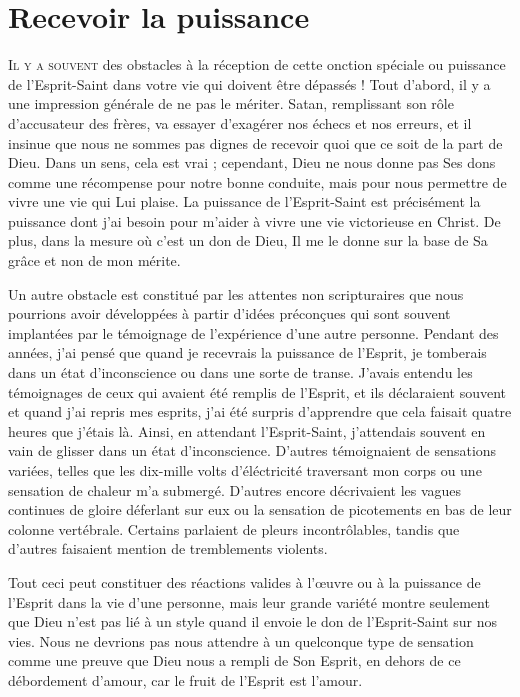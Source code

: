 \chapter{Recevoir la puissance}

\lettrine{I}{l y a souvent} des obstacles à la réception de cette onction
 spéciale ou puissance de l'Esprit-Saint dans votre vie qui doivent
 être dépassés ! Tout d'abord, il y a une impression générale
 de ne pas le mériter. Satan,  remplissant son rôle d'accusateur
 des frères, va essayer d'exagérer nos échecs et nos erreurs,
 et il insinue que nous ne sommes pas dignes de recevoir quoi que ce soit
 de la part de Dieu. Dans un sens, cela est vrai ;
 cependant, Dieu ne nous donne pas Ses dons comme une récompense
 pour notre bonne conduite, mais pour nous permettre de vivre une vie
 qui Lui plaise. La puissance de l'Esprit-Saint est précisément
 la puissance dont j'ai besoin pour m'aider à vivre une vie victorieuse
 en Christ. De plus, dans la mesure où c'est un don de Dieu,
 Il me le donne sur la base de Sa grâce et non de mon mérite.

Un autre obstacle est constitué par les attentes non scripturaires
 que nous pourrions avoir développées à partir d'idées préconçues
 qui sont souvent implantées par le témoignage de l'expérience 
 d'une autre personne. Pendant des années, j'ai pensé que
 quand je recevrais la puissance de l'Esprit, je tomberais dans un état
 d'inconscience ou dans une sorte de transe.
 J'avais entendu les témoignages de ceux qui avaient été remplis de l'Esprit,
 et ils déclaraient souvent\frcolon{} \Og [\dots{}] et quand j'ai repris mes esprits,
 j'ai été surpris d'apprendre que cela faisait quatre heures
 que j'étais là. \Fg{}
 Ainsi, en attendant l'Esprit-Saint, j'attendais souvent en vain
 de glisser dans un état d'inconscience.
 D'autres témoignaient de sensations variées, telles que
 \Og les dix-mille volts d'éléctricité traversant mon corps \Fg{} ou
 \Og une sensation de chaleur m'a submergé. \Fg{}
 D'autres encore décrivaient les vagues continues de gloire déferlant
 sur eux ou la sensation de picotements en bas de leur colonne vertébrale.
 Certains parlaient de pleurs incontrôlables,
 tandis que d'autres faisaient mention de tremblements violents.

Tout ceci peut constituer des réactions valides à l'œuvre
 ou à la puissance de l'Esprit dans la vie d'une personne,
 mais leur grande variété montre seulement que Dieu n'est pas lié
 à un style quand il envoie le don de l'Esprit-Saint sur nos vies.
 Nous ne devrions pas nous attendre à un quelconque type de sensation
 comme une preuve que Dieu nous a rempli de Son Esprit,
 en dehors de ce débordement d'amour, car le fruit de l'Esprit est l'amour.

